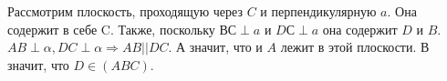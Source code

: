 Рассмотрим плоскость, проходящую через $C$ и перпендикулярную $a$. Она содержит в себе C. Также, поскольку $ВС\perp a$ и $DС\perp a$ она содержит $D$ и $B$. $AB\perp\alpha, DC\perp\alpha \Rightarrow AB||DC$. А значит, что и $A$ лежит в этой плоскости. В значит, что $D\in(ABC)$.